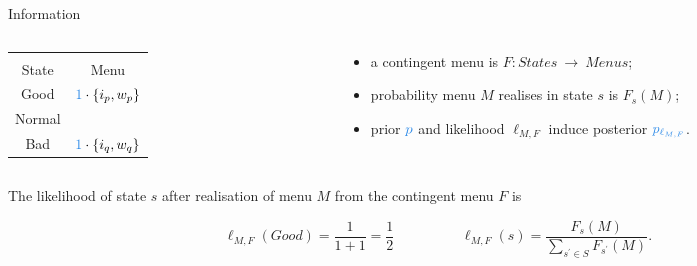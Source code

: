 \documentclass[usenames,dvipsnames,aspectratio=169,11pt, envcountsect, handout]{beamer}
\begin{document}
\begin{frame}[noframenumbering]{Information}
	\begin{columns}
		\begin{column}{0.35\textwidth} %
			\begin{center}
				\begin{table}
					\centering
					\begin{tabular}{c | c}
						\multicolumn{2}{c}{}                                                                \\
						State  & Menu                                                                       \\
						\hline
						Good   & \multirow{2}{*}{\( \textcolor{blue}{1} \cdot \left\{ i_p, w_p \right\} \)} \\
						Normal &                                                                            \\
						\hline
						Bad    & \(\textcolor{blue}{1} \cdot \left\{ i_q, w_q \right\} \)                   \\
					\end{tabular}
				\end{table}
			\end{center}
		\end{column}

		\begin{column}{0.65\textwidth} %
			\begin{itemize}
				\item a contingent menu is \(F: States \: \rightarrow \: Menus \);
				\item probability menu \( M \) realises in state \( s \) is \( F_s \left( M \right) \);
				\item prior \( \textcolor{blue}{p} \) and likelihood \( \ell_{M,F} \) induce posterior \( \textcolor{blue}{p_{\ell_{M,F}}} \).
			\end{itemize}
		\end{column}
	\end{columns}

	\vspace{0.6cm}

	The likelihood of state \(s\) after realisation of menu \(M\) from the contingent menu \(F\) is

	\vfill

	\[ \ell_{M, F} \left( Good \right) = \frac{1}{1+1} = \frac{1}{2} \hspace{2cm} \ell_{M, F} \left( s \right) = \frac{F_{s} \left( M \right)}{ \sum_{s^{\prime} \in S} F_{s^{\prime}} \left( M \right)} .
	\]

\end{frame}
\end{document}
